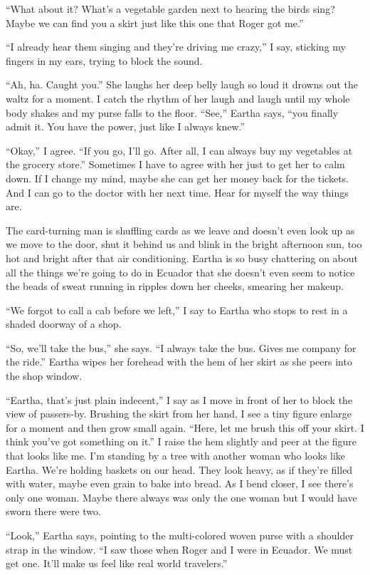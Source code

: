\documentclass[twoside,10pt]{book}
\begin{document}
``What about it? What's a vegetable garden next to hearing the birds
sing? Maybe we can find you a skirt just like this one that Roger got
me.''

``I already hear them singing and they're driving me crazy,'' I say,
sticking my fingers in my ears, trying to block the sound.

``Ah, ha. Caught you.'' She laughs her deep belly laugh so loud it
drowns out the waltz for a moment. I catch the rhythm of her laugh and
laugh until my whole body shakes and my purse falls to the floor.
``See,'' Eartha says, ``you finally admit it. You have the power, just
like I always knew.''

``Okay,'' I agree. ``If you go, I'll go. After all, I can always buy my
vegetables at the grocery store.'' Sometimes I have to agree with her
just to get her to calm down. If I change my mind, maybe she can get her
money back for the tickets. And I can go to the doctor with her next
time. Hear for myself the way things are.

The card-turning man is shuffling cards as we leave and doesn't even
look up as we move to the door, shut it behind us and blink in the
bright afternoon sun, too hot and bright after that air conditioning.
Eartha is so busy chattering on about all the things we're going to do
in Ecuador that she doesn't even seem to notice the beads of sweat
running in ripples down her cheeks, smearing her makeup.

``We forgot to call a cab before we left,'' I say to Eartha who stops to
rest in a shaded doorway of a shop.

``So, we'll take the bus,'' she says. ``I always take the bus. Gives me
company for the ride.'' Eartha wipes her forehead with the hem of her
skirt as she peers into the shop window.

``Eartha, that's just plain indecent,'' I say as I move in front of her
to block the view of passers-by. Brushing the skirt from her hand, I see
a tiny figure enlarge for a moment and then grow small again. ``Here,
let me brush this off your skirt. I think you've got something on it.''
I raise the hem slightly and peer at the figure that looks like me. I'm
standing by a tree with another woman who looks like Eartha. We're
holding baskets on our head. They look heavy, as if they're filled with
water, maybe even grain to bake into bread. As I bend closer, I see
there's only one woman. Maybe there always was only the one woman but I
would have sworn there were two.

``Look,'' Eartha says, pointing to the multi-colored woven purse with a
shoulder strap in the window. ``I saw those when Roger and I were in
Ecuador. We must get one. It'll make us feel like real world
travelers.''
\end{document}

